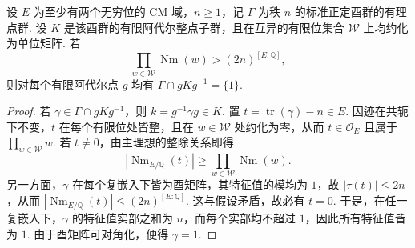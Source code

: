 \begin{lemma}[主同余层的稳定子判据]
\label{lem:a-free-congruence-level}
\emitthmsource
设 $E$ 为至少有两个无穷位的 CM 域，$n\ge1$，记 $\Gamma$ 为秩 $n$ 的标准正定酉群的有理点群. 设 $K$ 是该酉群的有限阿代尔整点子群，且在互异的有限位集合 $\mathcal W$ 上均约化为单位矩阵. 若
\[
 \prod_{w\in\mathcal W}\operatorname{Nm}(w)>(2n)^{[E:\mathbb Q]},
\]
则对每个有限阿代尔点 $g$ 均有 $\Gamma\cap gKg^{-1}=\{1\}$.
\end{lemma}
\begin{proof}
若 $\gamma\in\Gamma\cap gKg^{-1}$，则 $k=g^{-1}\gamma g\in K$. 置 $t=\operatorname{tr}(\gamma)-n\in E$. 因迹在共轭下不变，$t$ 在每个有限位处皆整，且在 $w\in\mathcal W$ 处约化为零，从而 $t\in\mathcal O_E$ 且属于 $\prod_{w\in\mathcal W} w$. 若 $t\ne0$，由主理想的整除关系即得
\[
 |\operatorname{Nm}_{E/\mathbb Q}(t)|
 \ge \prod_{w\in\mathcal W}\operatorname{Nm}(w).
\]
另一方面，$\gamma$ 在每个复嵌入下皆为酉矩阵，其特征值的模均为 $1$，故 $|\tau(t)|\le2n$，从而 $|\operatorname{Nm}_{E/\mathbb Q}(t)|\le(2n)^{[E:\mathbb Q]}$. 这与假设矛盾，故必有 $t=0$. 于是，在任一复嵌入下，$\gamma$ 的特征值实部之和为 $n$，而每个实部均不超过 $1$，因此所有特征值皆为 $1$. 由于酉矩阵可对角化，便得 $\gamma=1$.
\end{proof}

